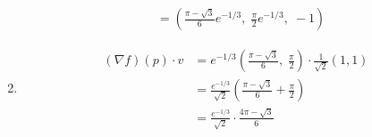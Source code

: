 \begin{solution}
\begin{enumerate}
$$\begin{aligned}
				                         & = \left( \frac{\pi - \sqrt{3}}{6} e^{-1/3}, \; \frac{\pi}{2} e^{-1/3},\; -1 \right)
			      \end{aligned}
		      $$
		\item
		      $$
			      \begin{aligned}
				      (\nabla f)(p) \cdot v & = e^{-1/3} \left( \frac{\pi - \sqrt{3}}{6}, \; \frac{\pi}{2} \right) \cdot \frac{1}{\sqrt{2}} (1,1) \\
				                            & = \frac{e^{-1/3}}{\sqrt{2}} \left( \frac{\pi - \sqrt{3}}{6} + \frac{\pi}{2} \right)                 \\
				                            & = \frac{e^{-1/3}}{\sqrt{2}} \cdot \frac{4\pi - \sqrt{3}}{6}
			      \end{aligned}
		      $$
	\end{enumerate}
\end{solution}

